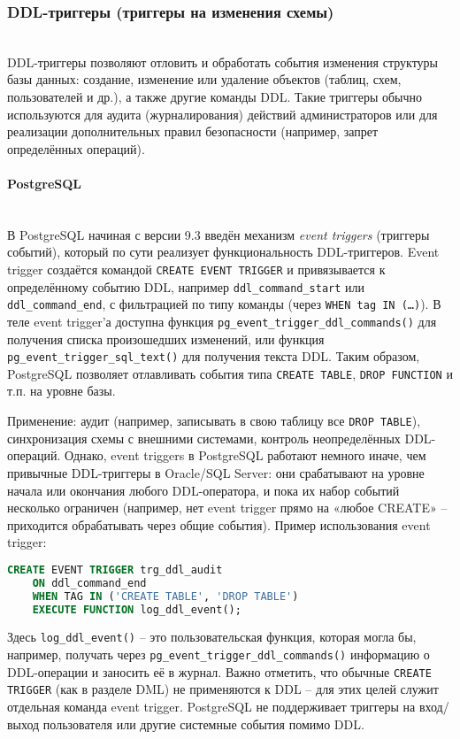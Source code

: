 \subsubsection{DDL-триггеры (триггеры на изменения схемы)} ~\\
 DDL-триггеры позволяют отловить и обработать события изменения структуры базы данных: создание, изменение или удаление объектов (таблиц, схем, пользователей и др.), а также другие команды DDL. Такие триггеры обычно используются для аудита (журналирования) действий администраторов или для реализации дополнительных правил безопасности (например, запрет определённых операций).

\paragraph{\textbf{PostgreSQL}} ~\\
 В PostgreSQL начиная с версии 9.3 введён механизм \textit{event triggers} (триггеры событий), который по сути реализует функциональность DDL-триггеров. Event trigger создаётся командой \texttt{CREATE EVENT TRIGGER} и привязывается к определённому событию DDL, например \texttt{ddl\_command\_start} или \texttt{ddl\_command\_end}, с фильтрацией по типу команды (через \texttt{WHEN tag IN (\ldots)}). В теле event trigger’а доступна функция \texttt{pg\_event\_trigger\_ddl\_commands()} для получения списка произошедших изменений, или функция \texttt{pg\_event\_trigger\_sql\_text()} для получения текста DDL. Таким образом, PostgreSQL позволяет отлавливать события типа \texttt{CREATE TABLE}, \texttt{DROP FUNCTION} и т.п. на уровне базы. 

 Применение: аудит (например, записывать в свою таблицу все \texttt{DROP TABLE}), синхронизация схемы с внешними системами, контроль неопределённых DDL-операций. Однако, event triggers в PostgreSQL работают немного иначе, чем привычные DDL-триггеры в Oracle/SQL Server: они срабатывают на уровне начала или окончания любого DDL-оператора, и пока их набор событий несколько ограничен (например, нет event trigger прямо на «любое CREATE» – приходится обрабатывать через общие события). Пример использования event trigger:

 \begin{lstlisting}[language=SQL]
    CREATE EVENT TRIGGER trg_ddl_audit
    ON ddl_command_end
    WHEN TAG IN ('CREATE TABLE', 'DROP TABLE')
    EXECUTE FUNCTION log_ddl_event();
 \end{lstlisting}

 Здесь \texttt{log\_ddl\_event()} – это пользовательская функция, которая могла бы, например, получать через \texttt{pg\_event\_trigger\_ddl\_commands()} информацию о DDL-операции и заносить её в журнал. Важно отметить, что обычные \texttt{CREATE TRIGGER} (как в разделе DML) не применяются к DDL – для этих целей служит отдельная команда event trigger. PostgreSQL не поддерживает триггеры на вход/выход пользователя или другие системные события помимо DDL.

